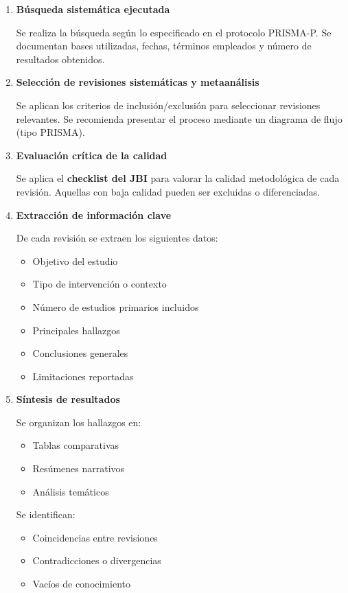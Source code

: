 \begin{enumerate}[resume]
    \item \textbf{Búsqueda sistemática ejecutada}

    Se realiza la búsqueda según lo especificado en el protocolo PRISMA-P. Se documentan bases utilizadas, fechas, términos empleados y número de resultados obtenidos.

    \item \textbf{Selección de revisiones sistemáticas y metaanálisis}

    Se aplican los criterios de inclusión/exclusión para seleccionar revisiones relevantes. Se recomienda presentar el proceso mediante un diagrama de flujo (tipo PRISMA).

    \item \textbf{Evaluación crítica de la calidad}

    Se aplica el \textbf{checklist del JBI} para valorar la calidad metodológica de cada revisión. Aquellas con baja calidad pueden ser excluidas o diferenciadas.

    \item \textbf{Extracción de información clave}

    De cada revisión se extraen los siguientes datos:

    \begin{itemize}
        \item Objetivo del estudio
        \item Tipo de intervención o contexto
        \item Número de estudios primarios incluidos
        \item Principales hallazgos
        \item Conclusiones generales
        \item Limitaciones reportadas
    \end{itemize}

    \item \textbf{Síntesis de resultados}

    Se organizan los hallazgos en:

    \begin{itemize}
        \item Tablas comparativas
        \item Resúmenes narrativos
        \item Análisis temáticos
    \end{itemize}

    Se identifican:
    \begin{itemize}
        \item Coincidencias entre revisiones
        \item Contradicciones o divergencias
        \item Vacíos de conocimiento
    \end{itemize}


\end{enumerate}

